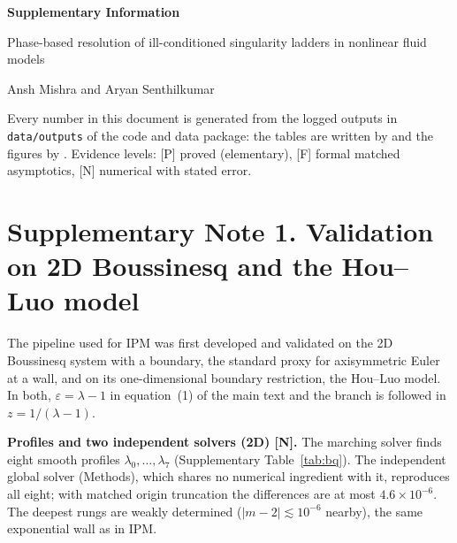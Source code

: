\documentclass[10pt]{article}
\begin{document}
\begin{center}
{\Large\bfseries Supplementary Information\par}
\vspace{0.5em}
{\large Phase-based resolution of ill-conditioned singularity ladders in nonlinear fluid models\par}
\vspace{0.4em}
{\small Ansh Mishra and Aryan Senthilkumar\par}
\end{center}

\tableofcontents
\vspace{1em}

Every number in this document is generated from the logged outputs in \texttt{data/outputs} of the code and data
package: the tables are written by  and the figures by
. Evidence levels: [P] proved (elementary), [F] formal matched asymptotics,
[N] numerical with stated error.

\section*{Supplementary Note 1. Validation on 2D Boussinesq and the Hou--Luo model}

The pipeline used for IPM was first developed and validated on the 2D Boussinesq system with a boundary, the
standard proxy for axisymmetric Euler at a wall\cite{s_chen2022}, and on its one-dimensional boundary restriction,
the Hou--Luo model\cite{s_choi2017}. In both, $\varepsilon=\lambda-1$ in equation~(1) of the main text and the branch
is followed in $z=1/(\lambda-1)$.

\textbf{Profiles and two independent solvers (2D) [N].} The marching solver finds eight smooth profiles
$\lambda_0,\dots,\lambda_7$ (Supplementary Table~\ref{tab:bq}). The independent global solver (Methods), which shares
no numerical ingredient with it, reproduces all eight; with matched origin truncation the differences are at most
$4.6\times10^{-6}$. The deepest rungs are weakly determined ($|m-2|\lesssim10^{-6}$ nearby), the same exponential
wall as in IPM.
\end{document}
